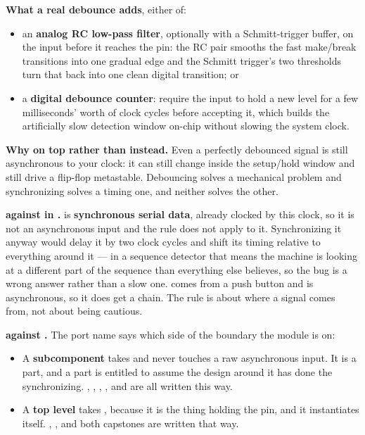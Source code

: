 \textbf{What a real debounce adds}, either of:
\begin{itemize}
  \item an \textbf{analog RC low-pass filter}, optionally with a Schmitt-trigger buffer, on the
    input before it reaches the pin: the RC pair smooths the fast make/break transitions into one
    gradual edge and the Schmitt trigger's two thresholds turn that back into one clean digital
    transition; or
  \item a \textbf{digital debounce counter}: require the input to hold a new level for a few
    milliseconds' worth of clock cycles before accepting it, which builds the artificially slow
    detection window on-chip without slowing the system clock.
\end{itemize}

\textbf{Why on top rather than instead.} Even a perfectly debounced signal is still asynchronous to
your clock: it can still change inside the setup/hold window and still drive a flip-flop
metastable. Debouncing solves a mechanical problem and synchronizing solves a timing one, and
neither solves the other. 

\textbf{ against  in .}  is
\textbf{synchronous serial data}, already clocked by this clock, so it is not an asynchronous input
and the rule does not apply to it. Synchronizing it anyway would delay it by two clock cycles and
shift its timing relative to everything around it --- in a sequence detector that means the machine
is looking at a different part of the sequence than everything else believes, so the bug is a wrong
answer rather than a slow one.  comes from a push button and is asynchronous, so it
does get a chain. The rule is about where a signal comes from, not about being cautious. 

\textbf{ against .} The port name says which side of the boundary
the module is on:
\begin{itemize}
  \item A \textbf{subcomponent} takes  and never touches a raw asynchronous input.
    It is a part, and a part is entitled to assume the design around it has done the synchronizing.
    , , , ,  and  are
    all written this way.
  \item A \textbf{top level} takes , because it is the thing holding the pin, and it
    instantiates  itself. , ,  and
    both capstones are written that way.
\end{itemize}
\noindent{}

